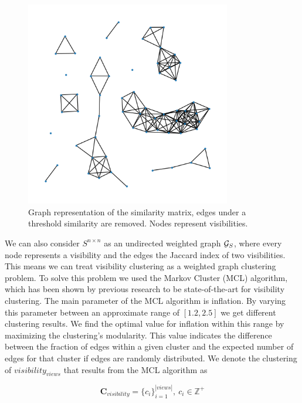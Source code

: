 \begin{figure}[h]
    \centering
    \includegraphics*[width=0.8\textwidth]{./fig/mutual_visibility_graph.png}
    \caption{Graph representation of the similarity matrix, edges under a threshold similarity are removed. Nodes represent visibilities.}
    \label{fig:similarity_graph}
\end{figure}

We can also consider \(S^{n \times n}\) as an undirected weighted graph \(\mathcal{G}_S\), where every node represents a visibility and the edges the Jaccard index of two visibilities. This means we can treat visibility clustering as a weighted graph clustering problem. To solve this problem we used the Markov Cluster (MCL) algorithm, which has been shown by previous research to be state-of-the-art for visibility clustering. The main parameter of the MCL algorithm is inflation. By varying this parameter between an approximate range of \([1.2, 2.5]\) we get different clustering results. We find the optimal value for inflation within this range by maximizing the clustering's modularity. This value indicates the difference between the fraction of edges within a given cluster and the expected number of edges for that cluster if edges are randomly distributed. We denote the clustering of \(visibility_{views}\) that results from the MCL algorithm as 

\begin{equation}
    \label{eq:c_visibility}
    \mathbf{C}_{visibility} = \{c_i\}_{i=1}^{|views|},\ c_i \in \mathbb{Z}^+
\end{equation}

